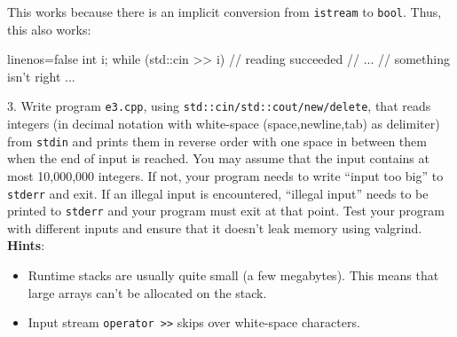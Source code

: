 \documentclass[a4paper,11pt]{article}
\begin{document}
This works because there is an implicit conversion from \texttt{istream} to \texttt{bool}. 
Thus, this also works:
\begin{cppcode*}{linenos=false}
int i;
while (std::cin >> i) {
    // reading succeeded
    // ...
}
// something isn't right ...
\end{cppcode*}

\linerule

3. Write {\CC} program \texttt{e3.cpp}, using \texttt{std::cin/std::cout/new/delete}, 
that reads integers (in decimal notation with white-space (space,newline,tab) as delimiter) 
from \texttt{stdin} and prints them in reverse order with one space in between them when the end of input is reached. 
You may assume that the input contains at most 10,000,000 integers. 
If not, your program needs to write ``input too big'' to \texttt{stderr} and exit. 
If an illegal input is encountered, ``illegal input'' needs to be printed to \texttt{stderr} and your program must exit at that point. 
Test your program with different inputs and ensure that it doesn't leak memory using valgrind.\\

\textbf{Hints}:
\begin{itemize}
    \item Runtime stacks are usually quite small (a few megabytes). This means that large arrays can't be allocated on the stack.
    \item Input stream \texttt{operator >>} skips over white-space characters.
\end{itemize}
\end{document}

